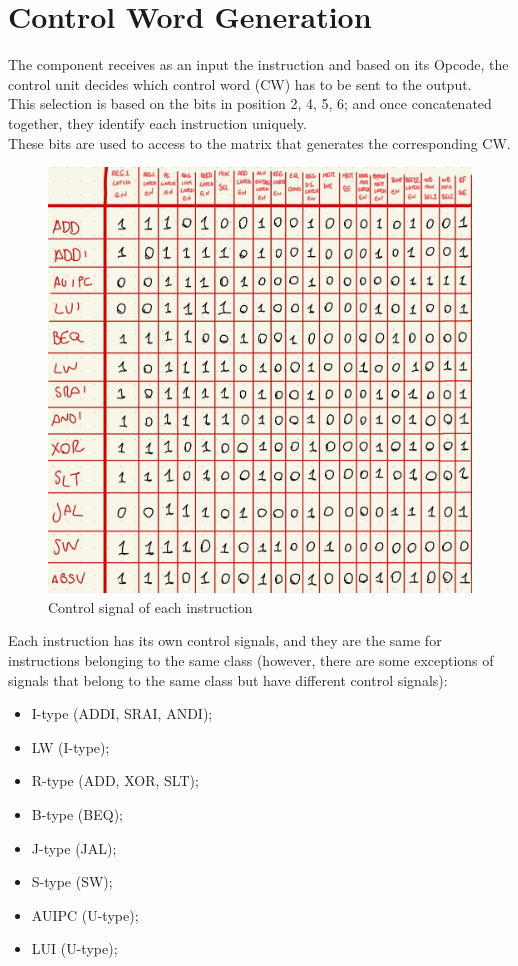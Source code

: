 \section{Control Word Generation}
The component receives as an input the instruction and based on its Opcode, the control unit decides which control word (CW) has to be sent to the output. \\
This selection is based on the bits in position 2, 4, 5, 6; and once concatenated together, they identify each instruction uniquely.\\
These bits are used to access to the matrix that generates the corresponding CW.\\
\begin{figure}[h!]
	\centering
	\includegraphics[width=16cm]{./images/control_signals}
	\caption{Control signal of each instruction}
	\label{fig3.3}
\end{figure}
Each instruction has its own control signals, and they are the same for instructions belonging to the same class (however, there are some exceptions of signals that belong to the same class but have different control signals):\\

\begin{itemize}
	\item I-type (ADDI, SRAI, ANDI);
	\item LW (I-type);
	\item R-type (ADD, XOR, SLT);
	\item B-type (BEQ);
	\item J-type (JAL);
	\item S-type (SW);
	\item AUIPC (U-type);
	\item LUI (U-type);		
\end{itemize}
